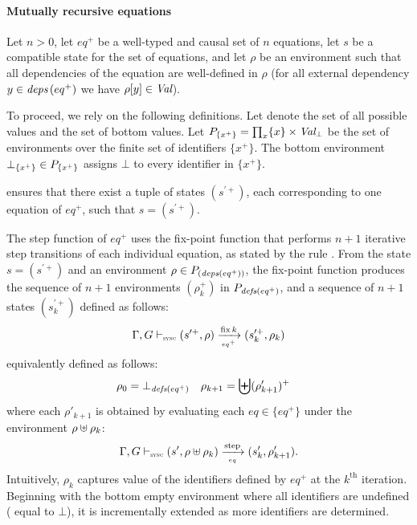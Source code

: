 \begin{skippableproof}
    \paragraph{Mutually recursive equations}

    Let $n>0$, let $eq^+$ be a well-typed and causal set of $n$ equations, let $s$ be a compatible
    state for the set of equations, and let $\rho$ be an environment such that all dependencies of
    the equation are well-defined in $\rho$ (\ie for all external dependency $y \in \deps{eq^+}$ we
    have $\rho[y] \in \Val$).

    To proceed, we rely on the following definitions.
    Let \Val denote the set of all possible values and \ValBot the set of bottom values.
    Let $P_{\{x^+\}} = \prod_x \{x\}\times\ValBot$ be the set of environments over the finite set of
    identifiers $\{x^+\}$.
    The bottom environment $\botrho{\{x^+\}} \in P_{\{x^+\}}$ assigns $\bot$ to every identifier
    in $\{x^+\}$.

     ensures that there exist a tuple of states
    $(s^{\prime+})$, each corresponding to one equation of $eq^+$, such that $s = (s^{\prime+})$.

    The step function of $eq^+$ uses the fix-point function that performs $n+1$ iterative step
    transitions of each individual equation, as stated by the rule
    .
    From the state $s = (s^{\prime+})$ and an environment $\rho \in P_{(\deps{eq^+})}$, the fix-point
    function produces the sequence of $n+1$ environments $(\rho_k^+)$ in $P_{\defs{eq^+}}$, and a
    sequence of $n+1$ states $(s_k^{\prime+})$ defined as follows:
    \begin{equation*}
        \fixsem{k}{\rho}{s^{\prime+}}{eq^+}{s_k^{\prime+}}{\rho_k}
    \end{equation*}
    equivalently defined as follows:
    \begin{align*}
        \rho_0 & = \botrho{\defs{eq^+}} & \rho_{k+1} & = \bigCtxconcat (\rho'_{k+1})^+
    \end{align*}
    where each $\rho'_{k+1}$ is obtained by evaluating each $eq \in \{eq^+\}$ under the environment
    $\rho \ctxconcat \rho_k$:
    \begin{equation*}
        \eqOpsem{\rho \ctxconcat \rho_k}{s'}{eq}{s'_k}{\rho'_{k+1}}.
    \end{equation*}
    Intuitively, $\rho_k$ captures value of the identifiers defined by $eq^+$ at the $k^\text{th}$
    iteration. Beginning with the bottom empty environment where all identifiers are undefined (\ie
    equal to $\bot$), it is incrementally extended as more identifiers are determined.


\end{skippableproof}
